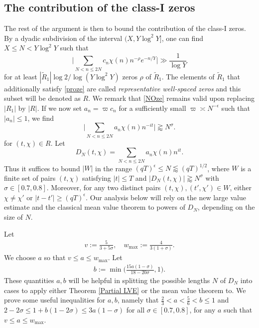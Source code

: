 \documentclass[12pt]{amsart}
\theoremstyle{definition}
\theoremstyle{plain}
\theoremstyle{remark}
\numberwithin{equation}{section}
\numberwithin{theorem}{section}
\numberwithin{equation}{section}
\begin{document}
	\subsection{The contribution of the class-I zeros}
	\label{TconclassI}
	The rest of the argument is then to bound the contribution of the class-I zeros. By a dyadic subdivision of the interval $(X, Y \log^2 Y]$, one can find $X \leq N < Y\log^2 Y$ such that 
	\begin{equation} \label{proze}
		\bigg| \sum_{N< n \leq 2N}c_n\chi(n) n^{-\rho}e^{-n/Y} \bigg| \gg \frac{1}{\log Y}
	\end{equation}
	for at least  $|\tilde{R}_1|\log 2/\log (Y\log^2 Y)$ zeros $\rho$ of $\tilde{R}_1$. The elements of $\tilde{R}_1$ that additionally satisfy \eqref{proze} are called \emph{representative well-spaced zeros} and this subset will be denoted as $R$. We remark that \eqref{NOze} remains valid upon replacing $|R_1|$ by $|R|$. If we now set $a_n = \varpi c_n$ for a sufficiently small $\varpi \asymp N^{-\epsilon}$ such that $|a_n| \leq 1$, we find
	\begin{equation*} 
		\bigg| \sum_{N< n \leq 2N}a_n\chi(n) n^{-it} \bigg| \gtrapprox N^{\sigma}.
	\end{equation*}
	for $(t, \chi) \in R$.
	Let
	\[
	D_{N}(t, \chi)=\sum_{N < n \leq 2N} a_{n}\chi(n)n^{it}.
	\]
	Thus it suffices to bound $|W|$ in the range
	$(qT)^{\epsilon} \leq N \lessapprox (qT)^{1/2}$, where $W$ is a finite set of
	pairs $(t,\chi)$ satisfying $|t|\leq T$ and
	$|D_N(t,\chi)|\gtrapprox N^\sigma$ with $\sigma\in[0.7,0.8]$.
	Moreover, for any two distinct pairs $(t,\chi),(t',\chi')\in W$, either
	$\chi\neq\chi'$ or $|t-t'|\geq(qT)^\epsilon$.
	Our analysis below will rely on the new large value estimate and the classical mean value theorem to powers of $D_N$, depending on the size of $N$. 
	
	Let
	\begin{align*}
		v:=\frac{5}{3+5\sigma}, \quad w_{\text{max}} := \frac{4}{3(1+\sigma)}.
	\end{align*}
	We choose $a$ so that $v \leq a \leq w_{\text{max}}$. 
	Let 
	\begin{align*}
		b := \min\bigg(\frac{15a(1-\sigma)}{18-20\sigma},1\bigg). 
	\end{align*} 
	These quantities $a,b$ will be helpful in splitting the possible lengths $N$ of $D_N$ into cases to apply either Theorem \ref{Partial LVE} or the mean value theorem to. We prove some useful inequalities for $a,b$, namely that $\frac{2}{3}< a< \frac{5}{6} < b \leq 1 $ and $2-2\sigma \leq 1+b(1-2\sigma) \leq 3a(1-\sigma)$ for all $\sigma \in [0.7,0.8]$, for any $a$ such that $v \leq a \leq w_{\text{max}}$.
	
\end{document}
